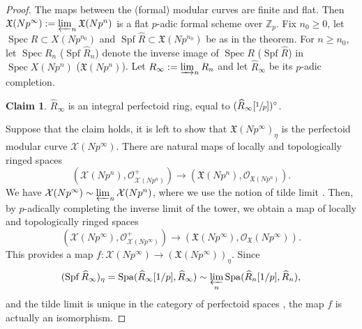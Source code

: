 \documentclass[JEP,XML,SOM,Unicode,published]{cedram}
\numberwithin{equation}{section}
\theoremstyle{definition}
\newtheorem*{claim}{Claim}
\newcommand{\bb}[1]{\mathbb{#1}}
\newcommand{\n}[1]{\mathcal{#1}}
\newcommand{\f}[1]{\mathfrak{#1}}
\newcommand{\s}[1]{\mathscr{#1}}
\DeclareMathOperator{\Spf}{Spf}
\DeclareMathOperator{\Spec}{Spec}
\DeclareMathOperator{\Spa}{Spa}
\newcommand{\mc}[1]{X(Np^{#1})}
\newcommand{\fmc}[1]{\mathfrak{X}(Np^{#1})}
\begin{document}
\begin{proof}
The maps between the (formal) modular curves are finite and flat. Then $\fmc{\infty}:=\varprojlim_{n} \fmc{n}$ is a flat $p$-adic formal scheme over $\bb{Z}_p$. Fix $n_0\geq 0$, let $\Spec R\subset \mc{n_0}$ and $\Spf \widehat{R}\subset \fmc{n_0}$ be as in the theorem. For $n\geq n_0$, let $\Spec R_n$ (\resp $\Spf \widehat{R}_n$) denote the inverse image of $\Spec R$ (\resp $\Spf \widehat{R}$) in $\Spec \mc{n}$ (\resp $\fmc{n}$). Let $R_{\infty}:=\varinjlim_n R_n$ and let $\widehat{R}_{\infty}$ be its $p$-adic completion.

\begin{claim} $\widehat{R}_{\infty}$ is an integral perfectoid ring, equal to $(\widehat{R}_{\infty}[\sfrac{1}{p}])^{\circ}$.
\end{claim}

Suppose that the claim holds, it is left to show that $\f{X}(Np^\infty)_{\eta}$ is the perfectoid modular curve $\n{X}(Np^\infty)$. There are natural maps of locally and topologically ringed spaces
\[(\n{X}(Np^n), \s{O}^+_{\n{X}(Np^n)})\to (\f{X}(Np^n), \s{O}_{\f{X}(Np^n)}).\]
We have $\n{X}(Np^{\infty})\sim \varprojlim_n \n{X}(Np^n)$, where we use the notion of tilde limit \cite[Def.\,2.4.1]{scholze2013moduli}. Then, by $p$-adically completing the inverse limit of the tower, we obtain a map of locally and topologically ringed spaces
\[
(\n{X}(Np^\infty), \s{O}^+_{\n{X}(Np^\infty)})\to (\f{X}(Np^\infty),\s{O}_{\f{X}}(Np^\infty)).
\]
This provides a map $f:\n{X}(Np^\infty)\to (\f{X}(Np^\infty))_{\eta}$. Since
\[
(\Spf \widehat{R}_{\infty})_{\eta} =\Spa(\widehat{R}_\infty[1/p], \widehat{R}_{\infty})\sim \varprojlim_n \Spa(\widehat{R}_n[1/p], \widehat{R}_{n}),
\]
and the tilde limit is unique in the category of perfectoid spaces \cite[Prop.\,2.4.5]{scholze2013moduli}, the map $f$ is actually an isomorphism.
\end{proof}
\end{document}
